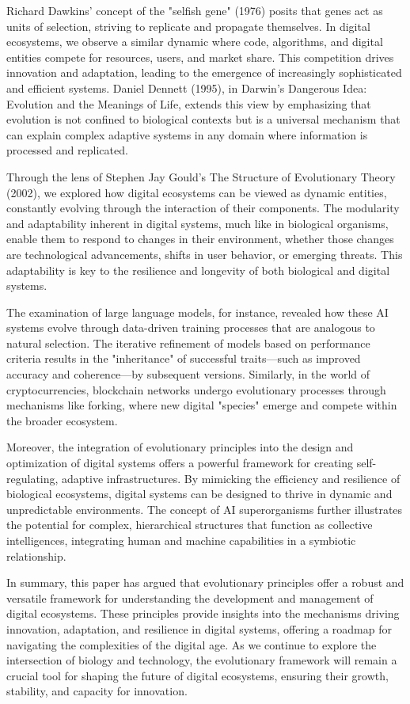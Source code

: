 \documentclass[12pt,twoside]{article}
\begin{document}
Richard Dawkins' concept of the "selfish gene" (1976) posits that genes act as units of selection, striving to replicate and propagate themselves. In digital ecosystems, we observe a similar dynamic where code, algorithms, and digital entities compete for resources, users, and market share. This competition drives innovation and adaptation, leading to the emergence of increasingly sophisticated and efficient systems. Daniel Dennett (1995), in Darwin’s Dangerous Idea: Evolution and the Meanings of Life, extends this view by emphasizing that evolution is not confined to biological contexts but is a universal mechanism that can explain complex adaptive systems in any domain where information is processed and replicated.

Through the lens of Stephen Jay Gould's The Structure of Evolutionary Theory (2002), we explored how digital ecosystems can be viewed as dynamic entities, constantly evolving through the interaction of their components. The modularity and adaptability inherent in digital systems, much like in biological organisms, enable them to respond to changes in their environment, whether those changes are technological advancements, shifts in user behavior, or emerging threats. This adaptability is key to the resilience and longevity of both biological and digital systems.

The examination of large language models, for instance, revealed how these AI systems evolve through data-driven training processes that are analogous to natural selection. The iterative refinement of models based on performance criteria results in the "inheritance" of successful traits—such as improved accuracy and coherence—by subsequent versions. Similarly, in the world of cryptocurrencies, blockchain networks undergo evolutionary processes through mechanisms like forking, where new digital "species" emerge and compete within the broader ecosystem.

Moreover, the integration of evolutionary principles into the design and optimization of digital systems offers a powerful framework for creating self-regulating, adaptive infrastructures. By mimicking the efficiency and resilience of biological ecosystems, digital systems can be designed to thrive in dynamic and unpredictable environments. The concept of AI superorganisms further illustrates the potential for complex, hierarchical structures that function as collective intelligences, integrating human and machine capabilities in a symbiotic relationship.

In summary, this paper has argued that evolutionary principles offer a robust and versatile framework for understanding the development and management of digital ecosystems. These principles provide insights into the mechanisms driving innovation, adaptation, and resilience in digital systems, offering a roadmap for navigating the complexities of the digital age. As we continue to explore the intersection of biology and technology, the evolutionary framework will remain a crucial tool for shaping the future of digital ecosystems, ensuring their growth, stability, and capacity for innovation.
\end{document}
